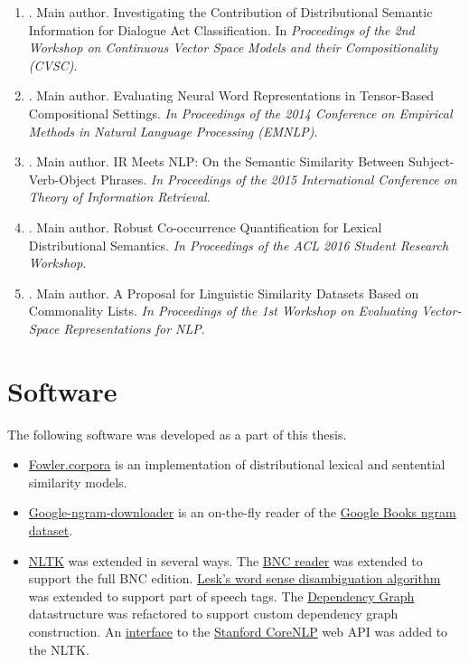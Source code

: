 \begin{enumerate}
\item \citet*{milajevs-purver:2014:CVSC}. Main author. Investigating the
  Contribution of Distributional Semantic Information for Dialogue Act
  Classification. In \textit{Proceedings of the 2nd Workshop on Continuous Vector Space Models and their Compositionality (CVSC)}.
\item \citet*{milajevs-EtAl:2014:EMNLP2014}. Main author. Evaluating Neural Word
  Representations in Tensor-Based Compositional Settings. \textit{In Proceedings of the 2014 Conference on Empirical Methods in Natural Language Processing (EMNLP)}.
\item \citet*{Milajevs:2015:IMN:2808194.2809448}. Main author. IR Meets NLP: On
  the Semantic Similarity Between Subject-Verb-Object Phrases. \textit{In Proceedings of the 2015 International Conference on Theory of Information Retrieval}.
\item \citet*{milajevs-sadrzadeh-purver:2016:ACL-SRW}. Main author. Robust Co-occurrence Quantification for Lexical Distributional Semantics. \textit{In Proceedings of the ACL 2016 Student Research Workshop}.
\item \citet*{milajevs-griffiths:2016:repeval}. Main author. A Proposal for Linguistic Similarity Datasets Based on Commonality Lists. \textit{In Proceedings of the 1st Workshop on Evaluating Vector-Space Representations for NLP}.
\end{enumerate}

\chapter*{Software}

The following software was developed as a part of this thesis.
\begin{itemize}
\item \href{http://fowlercorpora.readthedocs.io/en/latest/}{Fowler.corpora} is an implementation of distributional lexical and sentential similarity models.
\item \href{https://pypi.python.org/pypi/google-ngram-downloader}{Google-ngram-downloader} is an on-the-fly reader of the \href{http://storage.googleapis.com/books/ngrams/books/datasetsv2.html}{Google Books ngram dataset}.
\item \href{http://www.nltk.org/}{NLTK} was extended in several ways. The \href{https://github.com/nltk/nltk/blob/develop/nltk/corpus/reader/bnc.py}{BNC reader} was extended to support the full BNC edition. \href{https://github.com/nltk/nltk/blob/develop/nltk/wsd.py}{Lesk's word sense disambiguation algorithm} was extended to support part of speech tags. The \href{https://github.com/nltk/nltk/blob/develop/nltk/parse/dependencygraph.py}{Dependency Graph} datastructure was refactored to support custom dependency graph construction. An \href{https://github.com/nltk/nltk/pull/1249}{interface} to the \href{http://stanfordnlp.github.io/CoreNLP/}{Stanford CoreNLP} web API was added to the NLTK.
\end{itemize}

